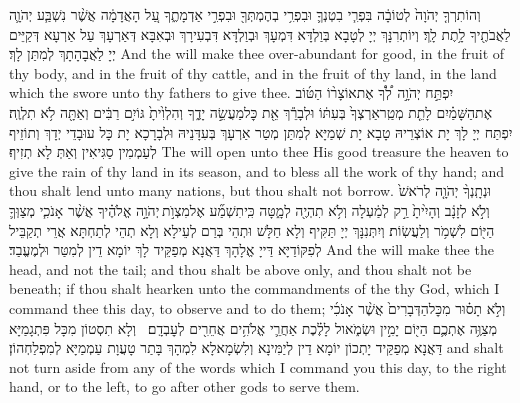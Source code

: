 {וְהוֹתִרְךָ֤ יְהֹוָה֙ לְטוֹבָ֔ה בִּפְרִ֧י בִטְנְךָ֛ וּבִפְרִ֥י בְהֶמְתְּךָ֖ וּבִפְרִ֣י אַדְמָתֶ֑ךָ עַ֚ל הָאֲדָמָ֔ה אֲשֶׁ֨ר נִשְׁבַּ֧ע יְהֹוָ֛ה לַאֲבֹתֶ֖יךָ לָ֥תֶת לָֽךְ׃}
{וְיוֹתְרִנָּךְ יְיָ לְטָבָא בְּוַלְדָּא דִּמְעָךְ וּבְוַלְדָּא דִּבְעִירָךְ וּבְאִבָּא דְּאַרְעָךְ עַל אַרְעָא דְּקַיֵּים יְיָ לַאֲבָהָתָךְ לְמִתַּן לָךְ׃}
{And the \lord\space will make thee over-abundant for good, in the fruit of thy body, and in the fruit of thy cattle, and in the fruit of thy land, in the land which the \lord\space swore unto thy fathers to give thee.}{}
{יִפְתַּ֣ח יְהֹוָ֣ה \pasek  לְ֠ךָ֠ אֶת\maqqaf אוֹצָר֨וֹ הַטּ֜וֹב אֶת\maqqaf הַשָּׁמַ֗יִם לָתֵ֤ת מְטַֽר\maqqaf אַרְצְךָ֙ בְּעִתּ֔וֹ וּלְבָרֵ֕ךְ אֵ֖ת כׇּל\maqqaf מַעֲשֵׂ֣ה יָדֶ֑ךָ וְהִלְוִ֙יתָ֙ גּוֹיִ֣ם רַבִּ֔ים וְאַתָּ֖ה לֹ֥א תִלְוֶֽה׃}
{יִפְתַּח יְיָ לָךְ יָת אוֹצְרֵיהּ טָבָא יָת שְׁמַיָּא לְמִתַּן מְטַר אַרְעָךְ בְּעִדָּנֵיהּ וּלְבָרָכָא יָת כָּל עוּבָדֵי יְדָךְ וְתוֹזֵיף לְעַמְמִין סַגִּיאִין וְאַתְּ לָא תְזִיף׃}
{The \lord\space will open unto thee His good treasure the heaven to give the rain of thy land in its season, and to bless all the work of thy hand; and thou shalt lend unto many nations, but thou shalt not borrow.}{}
{וּנְתָֽנְךָ֨ יְהֹוָ֤ה לְרֹאשׁ֙ וְלֹ֣א לְזָנָ֔ב וְהָיִ֙יתָ֙ רַ֣ק לְמַ֔עְלָה וְלֹ֥א תִהְיֶ֖ה לְמָ֑טָּה כִּֽי\maqqaf תִשְׁמַ֞ע אֶל\maqqaf מִצְוֺ֣ת \legarmeh  יְהֹוָ֣ה אֱלֹהֶ֗יךָ אֲשֶׁ֨ר אָנֹכִ֧י מְצַוְּךָ֛ הַיּ֖וֹם לִשְׁמֹ֥ר וְלַעֲשֽׂוֹת׃}
{וְיִתְּנִנָּךְ יְיָ תַּקִּיף וְלָא חַלָּשׁ וּתְהֵי בְּרַם לְעֵילָא וְלָא תְהֵי לְתַחְתָּא אֲרֵי תְקַבֵּיל לְפִקּוֹדַיָּא דַּייָ אֱלָהָךְ דַּאֲנָא מְפַקֵּיד לָךְ יוֹמָא דֵין לְמִטַּר וּלְמֶעֱבַד׃}
{And the \lord\space will make thee the head, and not the tail; and thou shalt be above only, and thou shalt not be beneath; if thou shalt hearken unto the commandments of the \lord\space thy God, which I command thee this day, to observe and to do them;}{}
{וְלֹ֣א תָס֗וּר מִכׇּל\maqqaf הַדְּבָרִים֙ אֲשֶׁ֨ר אָנֹכִ֜י מְצַוֶּ֥ה אֶתְכֶ֛ם הַיּ֖וֹם יָמִ֣ין וּשְׂמֹ֑אול לָלֶ֗כֶת אַחֲרֵ֛י אֱלֹהִ֥ים אֲחֵרִ֖ים לְעׇבְדָֽם׃ \petucha }
{וְלָא תִסְטוֹן מִכָּל פִּתְגָמַיָּא דַּאֲנָא מְפַקֵּיד יָתְכוֹן יוֹמָא דֵין לְיַמִּינָא וְלִשְׂמָאלָא לִמְהָךְ בָּתַר טָעֲוָת עַמְמַיָּא לְמִפְלַחְהוֹן׃}
{and shalt not turn aside from any of the words which I command you this day, to the right hand, or to the left, to go after other gods to serve them.}{}

